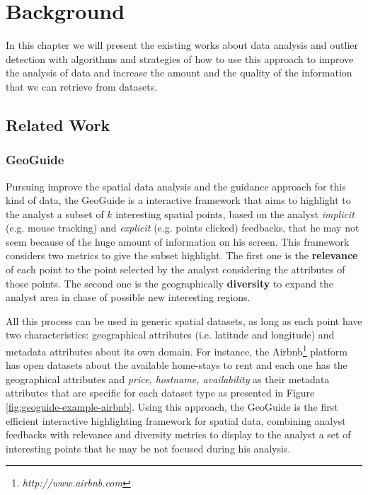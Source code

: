 \chapter{Background}

In this chapter we will present the existing works about data analysis and
outlier detection with algorithms and strategies of how to use this approach to
improve the analysis of data and increase the amount and the quality of the
information that we can retrieve from datasets.

\section{Related Work}

\subsection{GeoGuide}

Pursuing improve the spatial data analysis and the guidance approach for this kind of data, the GeoGuide \cite{omidvarTehrani2017} is a interactive framework that aims to highlight to the analyst a subset of $k$ interesting spatial points, based on the analyst \textit{implicit} (e.g. mouse tracking) and \textit{explicit} (e.g. points clicked) feedbacks, that he may not seem because of the huge amount of information on his screen. This framework considers two metrics to give the subset highlight. The first one is the \textbf{relevance} of each point to the point selected by the analyst considering the attributes of those points. The second one is the geographically \textbf{diversity} to expand the analyst area in chase of possible new interesting regions.

All this process can be used in generic spatial datasets, as long as each point have two characteristics: geographical attributes (i.e. latitude and longitude) and metadata attributes about its own domain. For instance, the Airbnb\footnote{\it http://www.airbnb.com} platform has open datasets about the available home-stays to rent and each one has the geographical attributes and \textit{price, hostname, availability} as their metadata attributes that are specific for each dataset type as presented in Figure \ref{fig:geoguide-example-airbnb}. Using this approach, the GeoGuide is the first efficient interactive highlighting framework for spatial data, combining analyst feedbacks with relevance and diversity metrics to display to the analyst a set of interesting points that he may be not focused during his analysis.

